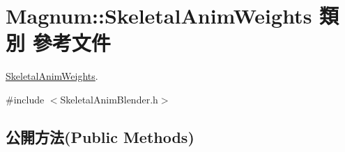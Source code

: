 \hypertarget{class_magnum_1_1_skeletal_anim_weights}{}\section{Magnum\+:\+:Skeletal\+Anim\+Weights 類別 參考文件}
\label{class_magnum_1_1_skeletal_anim_weights}


\hyperlink{class_magnum_1_1_skeletal_anim_weights}{Skeletal\+Anim\+Weights}.  




{\ttfamily \#include $<$Skeletal\+Anim\+Blender.\+h$>$}

\subsection*{公開方法(Public Methods)}
